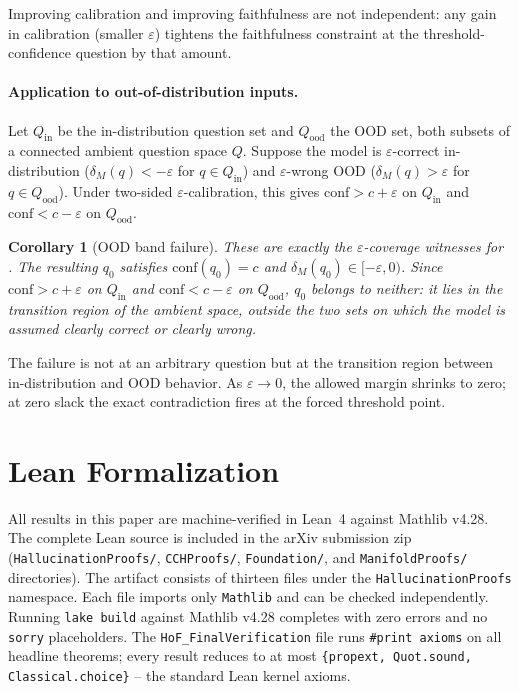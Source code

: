 \documentclass[10pt]{article}
\newtheorem{corollary}[theorem]{Corollary}
\newcommand{\conf}{\mathrm{conf}}
\begin{document}
Improving calibration and improving faithfulness are not independent:
any gain in calibration (smaller $\varepsilon$) tightens the faithfulness
constraint at the threshold-confidence question by that amount.

\paragraph{Application to out-of-distribution inputs.}
\label{par:ood}
Let $Q_\mathrm{in}$ be the in-distribution question set and $Q_\mathrm{ood}$
the OOD set, both subsets of a connected ambient question space $Q$. Suppose
the model is $\varepsilon$-correct in-distribution ($\delta_M(q) < -\varepsilon$
for $q \in Q_\mathrm{in}$) and $\varepsilon$-wrong OOD ($\delta_M(q) > \varepsilon$
for $q \in Q_\mathrm{ood}$). Under two-sided $\varepsilon$-calibration, this
gives $\conf > c+\varepsilon$ on $Q_\mathrm{in}$ and $\conf < c-\varepsilon$ on
$Q_\mathrm{ood}$.

\begin{corollary}[OOD band failure]
\label{cor:ood}
These are exactly the $\varepsilon$-coverage witnesses for .
The resulting $q_0$ satisfies $\conf(q_0) = c$ and $\delta_M(q_0) \in
[-\varepsilon, 0)$. Since $\conf > c+\varepsilon$ on $Q_\mathrm{in}$ and
$\conf < c-\varepsilon$ on $Q_\mathrm{ood}$, $q_0$ belongs to neither: it
lies in the transition region of the ambient space, outside the two sets on
which the model is assumed clearly correct or clearly wrong.
\end{corollary}

The failure is not at an arbitrary question but at the transition region between
in-distribution and OOD behavior. As $\varepsilon \to 0$, the allowed margin
shrinks to zero; at zero slack the exact contradiction fires at the forced
threshold point.

\section{Lean Formalization}
\label{sec:lean}

All results in this paper are machine-verified in Lean~4 against
Mathlib v4.28. The complete Lean source is included in the arXiv
submission zip (\texttt{HallucinationProofs/}, \texttt{CCHProofs/},
\texttt{Foundation/}, and \texttt{ManifoldProofs/} directories).
The artifact consists of thirteen files under the
\texttt{HallucinationProofs} namespace. Each file imports only
\texttt{Mathlib} and can be checked independently. Running
\texttt{lake build} against Mathlib v4.28 completes with zero errors
and no \texttt{sorry} placeholders. The \texttt{HoF\_FinalVerification}
file runs \texttt{\#print axioms} on all headline theorems; every result
reduces to at most \texttt{\{propext, Quot.sound, Classical.choice\}} --
the standard Lean kernel axioms.
\end{document}

